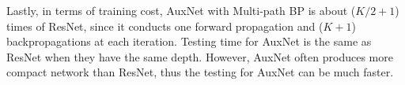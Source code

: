 \documentclass[10pt,onecolumn,letterpaper]{article}
\def\mF{{\mathcal F}}
\def\bmW{\mbox{\boldmath${\mathcal W}$}}
\def\bg{{\bf g}}
\def\bx{{\bf x}}
\def\SexyName{AuxNet\xspace}
\begin{document}
Lastly, in terms of training cost, AuxNet with Multi-path BP is about ($K/2+1$) times of ResNet, since it conducts one forward propagation and ($K+1$) backpropagations at each iteration. Testing time for AuxNet is the same as ResNet when they have the same depth. However, AuxNet often produces
more compact network than ResNet, thus the testing for AuxNet can be much faster.










\end{document}
